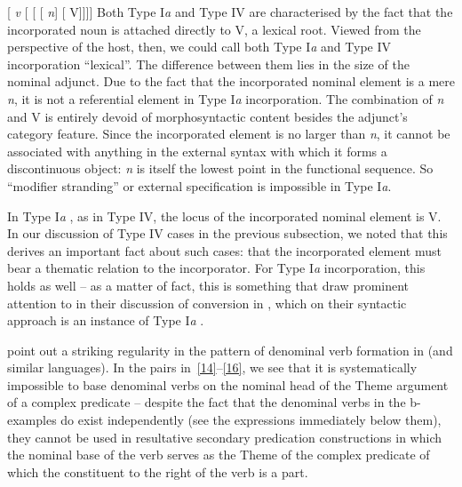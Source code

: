 \documentclass[output=paper]{langsci/langscibook}
\begin{document}
\begin{refcontext}
\ea  {}[ \emph{v}\tss{\{[+V], \Acc{}, \ldots{}\}} [
[ [ \hspace{-.7ex}\emph{n}\tss{\{[+N]\}}] [ \hspace{-.7ex}V]]]]\label{13}
\z
Both Type I\emph{a} and Type IV  are characterised by the
fact that the incorporated noun is attached directly to V, a lexical root.
Viewed from the perspective of the host, then, we could call both Type
I\emph{a} and Type IV incorporation \enquote{lexical}. The difference between
them lies in the size of the nominal adjunct. Due to the fact that the
incorporated nominal element is a mere \emph{n}, it is not a referential
element in Type I\emph{a} incorporation. The combination of \emph{n} and V is
entirely devoid of morphosyntactic content besides the adjunct's category
feature. Since the incorporated element is no larger than \emph{n}, it cannot
be associated with anything in the external syntax with which it forms a
discontinuous object: \emph{n} is itself the lowest point in the functional
sequence. So \enquote{modifier stranding} or external specification is
impossible in Type I\emph{a}.

In Type I\emph{a} , as in Type IV, the locus of the
incorporated nominal element is V. In our discussion of Type IV cases in the
previous subsection, we noted that this derives an important fact about such
cases: that the incorporated element must bear a thematic relation to the
incorporator. For Type I\emph{a} incorporation, this holds as well -- as a
matter of fact, this is something that \cite{halekeyser} draw prominent
attention to in their discussion of conversion in , which on their
syntactic approach is an instance of Type I\emph{a} .

\cite{halekeyser} point out a striking regularity in the pattern of denominal
verb formation in  (and similar languages). In the pairs
in~\eqref{14}--\eqref{16}, we see that it is systematically impossible to base
denominal verbs on the nominal head of the Theme argument of a complex
predicate -- despite the fact that the denominal verbs in the b-examples do
exist independently (see the expressions immediately below them), they cannot
be used in resultative secondary predication constructions in which the nominal
base of the verb serves as the Theme of the complex predicate of which the
constituent to the right of the verb is a part.

\ea \label{14}
    \z
\z


\end{refcontext}
\end{document}
